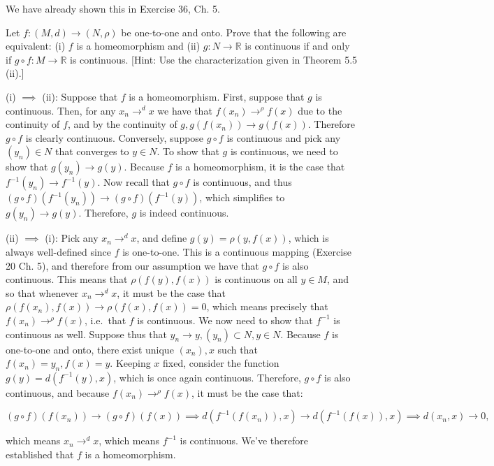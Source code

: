 \begin{solution}
    
    We have already shown this in Exercise 36, Ch. 5.
\end{solution}

\begin{exercise}{54}
    Let $f: (M, d) \rightarrow (N, \rho)$ be one-to-one and onto.
    Prove that the following are equivalent: (i) $f$ is a homeomorphism and (ii) $g: N \rightarrow \mathbb{R}$ is continuous if and only if $g \circ f: M \rightarrow \mathbb{R}$ is continuous. [Hint: Use the characterization given in Theorem 5.5 (ii).]
\end{exercise}

\begin{solution}
    
    (i) $\implies$ (ii): Suppose that $f$ is a homeomorphism.
    First, suppose that $g$ is continuous.
    Then, for any $x_n \rightarrow^{d} x$ we have that $f(x_n) \rightarrow^{\rho} f(x)$ due to the continuity of $f$, and by the continuity of $g, g(f(x_n)) \rightarrow g(f(x))$.
    Therefore $g \circ f$ is clearly continuous.
    Conversely, suppose $g \circ f$ is continuous and pick any $(y_n) \in N$ that converges to $y \in N$.
    To show that $g$ is continuous, we need to show that $g(y_n) \rightarrow g(y)$.
    Because $f$ is a homeomorphism, it is the case that $f^{-1}(y_n) \rightarrow f^{-1}(y)$.
    Now recall that $g \circ f$ is continuous, and thus $(g \circ f)(f^{-1}(y_n)) \rightarrow (g \circ f)(f^{-1}(y))$, which simplifies to $g(y_n) \rightarrow g(y)$.
    Therefore, $g$ is indeed continuous.

    (ii) $\implies$ (i): Pick any $x_n \rightarrow^{d} x$, and define $g(y) = \rho(y, f(x))$, which is always well-defined since $f$ is one-to-one.
    This is a continuous mapping (Exercise 20 Ch. 5), and therefore from our assumption we have that $g \circ f$ is also continuous.
    This means that $\rho(f(y), f(x))$ is continuous on all $y \in M$, and so that whenever $x_n \rightarrow^{d} x$, it must be the case that $\rho(f(x_n), f(x)) \rightarrow \rho(f(x), f(x)) = 0$, which means precisely that $f(x_n) \rightarrow^{\rho} f(x)$, i.e.\ that $f$ is continuous.
    We now need to show that $f^{-1}$ is continuous as well.
    Suppose thus that $y_n \rightarrow y, (y_n) \subset N, y \in N$.
    Because $f$ is one-to-one and onto, there exist unique $(x_n), x$ such that $f(x_n) = y_n, f(x) = y$.
    Keeping $x$ fixed, consider the function $g(y) = d(f^{-1}(y), x)$, which is once again continuous.
    Therefore, $g \circ f$ is also continuous, and because $f(x_n) \rightarrow^{\rho} f(x)$, it must be the case that:
    
    \[(g \circ f)(f(x_n)) \rightarrow (g \circ f)(f(x)) \implies d(f^{-1}(f(x_n)), x) \rightarrow d(f^{-1}(f(x)), x) \implies d(x_n, x) \rightarrow 0,\]

    which means $x_n \rightarrow^{d} x$, which means $f^{-1}$ is continuous.
    We've therefore established that $f$ is a homeomorphism.

\end{solution}

